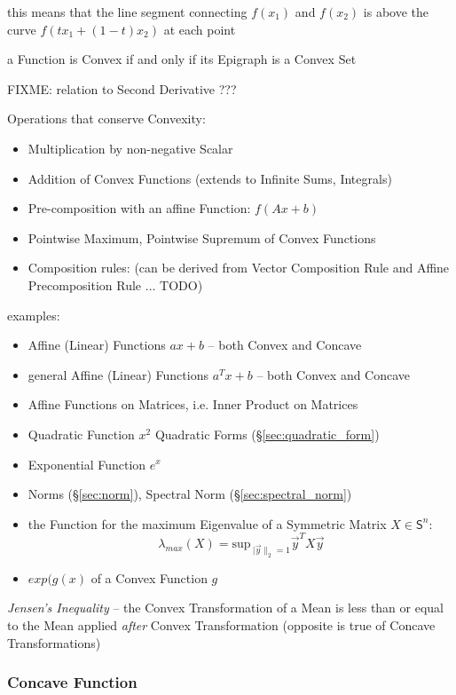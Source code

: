 this means that the line segment connecting $f(x_1)$ and $f(x_2)$ is above the
curve $f(tx_1 + (1-t)x_2)$ at each point

a Function is Convex if and only if its Epigraph is a Convex Set

FIXME: relation to Second Derivative ???

Operations that conserve Convexity:
\begin{itemize}
  \item Multiplication by non-negative Scalar
  \item Addition of Convex Functions (extends to Infinite Sums, Integrals)
  \item Pre-composition with an affine Function: $f(Ax + b)$
  \item Pointwise Maximum, Pointwise Supremum of Convex Functions
  \item Composition rules: (can be derived from Vector Composition Rule and
    Affine Precomposition Rule ... TODO)
\end{itemize}

examples:
\begin{itemize}
  \item Affine (Linear) Functions $ax + b$ -- both Convex and Concave
  \item general Affine (Linear) Functions $a^T x + b$ -- both Convex and Concave
  \item Affine Functions on Matrices, i.e. Inner Product on Matrices
  \item Quadratic Function $x^2$ \fist Quadratic Forms
    (\S\ref{sec:quadratic_form})
  \item Exponential Function $e^x$
  \item Norms (\S\ref{sec:norm}), Spectral Norm (\S\ref{sec:spectral_norm})
  \item the Function for the maximum Eigenvalue of a Symmetric Matrix $X \in
    \mathsf{S}^n$:
    \[
      \lambda_{max}(X) = \mathrm{sup}_{\ |\vec{y}\|_2=1} \vec{y}^T X \vec{y}
    \]
  \item $exp (g(x)$ of a Convex Function $g$
\end{itemize}

\emph{Jensen's Inequality} -- the Convex Transformation of a Mean is less than
or equal to the Mean applied \emph{after} Convex Transformation (opposite is
true of Concave Transformations)



\subsubsection{Concave Function}\label{sec:concave_function}

